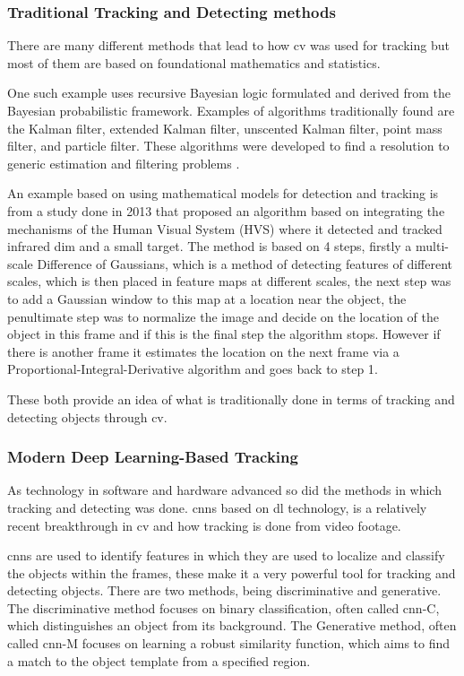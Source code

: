 \documentclass[12pt,a4paper]{article}
\begin{document}
\subsubsection{Traditional Tracking and Detecting methods}
There are many different methods that lead to how \acs{cv} was used for tracking but most of them are based on foundational mathematics and statistics. 

One such example uses recursive Bayesian logic formulated and derived from the Bayesian probabilistic framework. Examples of algorithms traditionally found are the Kalman filter, extended Kalman filter, unscented Kalman filter, point mass filter, and particle filter. These algorithms were developed to find a resolution to generic estimation and filtering problems \parencite{challa2011fundamentals}.

An example based on using mathematical models for detection and tracking is from a study done in 2013 that proposed an algorithm based on integrating the mechanisms of the Human Visual System (HVS) where it detected and tracked infrared dim and a small target. The method is based on 4 steps, firstly a multi-scale Difference of Gaussians, which is a method of detecting features of different scales, which is then placed in feature maps at different scales, the next step was to add a Gaussian window to this map at a location near the object, the penultimate step was to normalize the image and decide on the location of the object in this frame and if this is the final step the algorithm stops. However if there is another frame it estimates the location on the next frame via a Proportional-Integral-Derivative algorithm and goes back to step 1\parencite{Mirzaei2016, dong2014infrared}.

These both provide an idea of what is traditionally done in terms of tracking and detecting objects through \acs{cv}.

\subsubsection{Modern Deep Learning-Based Tracking}

As technology in software and hardware advanced so did the methods in which tracking and detecting was done. \acl{cnn}s based on \acl{dl} technology\parencite{pal2021deep}, is a relatively recent breakthrough in \acs{cv} and how tracking is done from video footage.

\acs{cnn}s are used to identify features in which they are used to localize and classify the objects within the frames\parencite{pal2021deep}, these make it a very powerful tool for tracking and detecting objects. There are two methods, being discriminative and generative. The discriminative method focuses on binary classification, often called \acs{cnn}-C, which distinguishes an object from its background. The Generative method, often called \acs{cnn}-M focuses on learning a robust similarity function, which aims to find a match to the object template from a specified region\parencite{li2018deep}.
\end{document}
